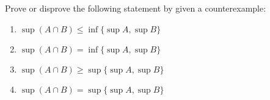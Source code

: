 Prove or disprove the following statement by given a counterexample:

\begin{enumerate}
	\item $\sup (A \cap B) \leq \inf \{ \sup A, \sup B\}$
	\item $\sup (A \cap B) = \inf \{ \sup A,\sup B\}$
	\item $\sup (A \cap B) \geq \sup \{\sup A , \sup B\}$
	\item $\sup (A \cap B) = \sup \{\sup A , \sup B\}$
\end{enumerate}

\begin{tcolorbox}
	\begin{solution}
		
	\end{solution}
\end{tcolorbox}